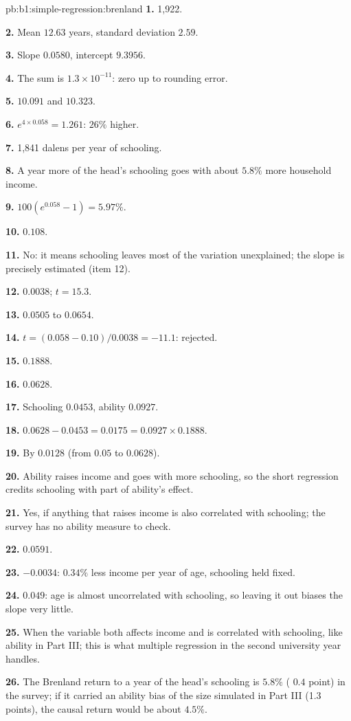 \begin{solution}{pb:b1:simple-regression:brenland}
\textbf{1.} 1,922.

\textbf{2.} Mean $12.63$ years, standard deviation $2.59$.

\textbf{3.} Slope $0.0580$, intercept $9.3956$.

\textbf{4.} The sum is $1.3 \times 10^{-11}$: zero up to rounding error.

\textbf{5.} $10.091$ and $10.323$.

\textbf{6.} $e^{4 \times 0.058} = 1.261$: $26\%$ higher.

\textbf{7.} 1,841 dalens per year of schooling.

\textbf{8.} A year more of the head's schooling goes with about $5.8\%$ more
household income.

\textbf{9.} $100(e^{0.058} - 1) = 5.97\%$.

\textbf{10.} $0.108$.

\textbf{11.} No: it means schooling leaves most of the variation unexplained;
the slope is precisely estimated (item 12).

\textbf{12.} $0.0038$; $t = 15.3$.

\textbf{13.} $0.0505$ to $0.0654$.

\textbf{14.} $t = (0.058 - 0.10)/0.0038 = -11.1$: rejected.

\textbf{15.} $0.1888$.

\textbf{16.} $0.0628$.

\textbf{17.} Schooling $0.0453$, ability $0.0927$.

\textbf{18.} $0.0628 - 0.0453 = 0.0175 = 0.0927 \times 0.1888$.

\textbf{19.} By $0.0128$ (from $0.05$ to $0.0628$).

\textbf{20.} Ability raises income and goes with more schooling, so the short
regression credits schooling with part of ability's effect.

\textbf{21.} Yes, if anything that raises income is also correlated with
schooling; the survey has no ability measure to check.

\textbf{22.} $0.0591$.

\textbf{23.} $-0.0034$: $0.34\%$ less income per year of age, schooling held fixed.

\textbf{24.} $0.049$: age is almost uncorrelated with schooling, so leaving it out
biases the slope very little.

\textbf{25.} When the variable both affects income and is correlated with
schooling, like ability in Part III; this is what multiple regression in
the second university year handles.

\textbf{26.} The Brenland return to a year of the head's schooling is $5.8\%$
( $0.4$ point) in the survey; if it carried an ability bias of
the size simulated in Part III (1.3 points), the causal return would be
about $4.5\%$.
\end{solution}

